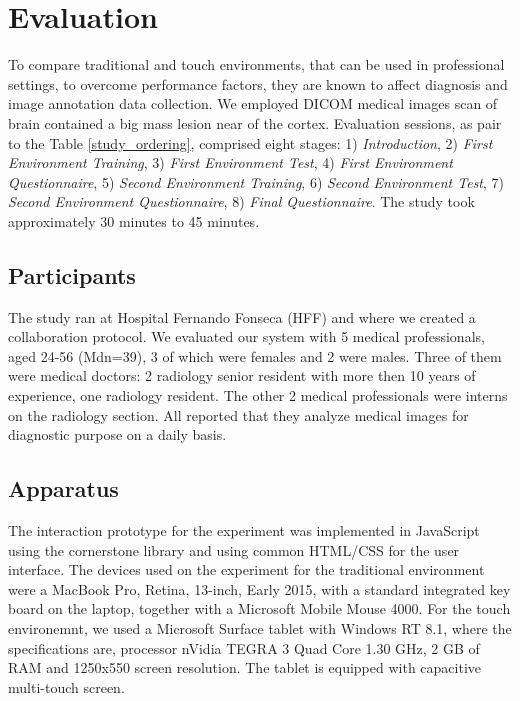 \documentclass{sigchi}
\begin{document}
\section{Evaluation}

To compare traditional and touch environments, that can be used in professional settings, to overcome performance factors, they are known to affect diagnosis and image annotation data collection. We employed DICOM \cite{mildenberger2002introduction} medical images scan of brain contained a big mass lesion near of the cortex. Evaluation sessions, as pair to the Table \ref{study_ordering}, comprised eight stages: 1) \textit{Introduction}, 2) \textit{First Environment Training}, 3) \textit{First Environment Test}, 4) \textit{First Environment Questionnaire}, 5) \textit{Second Environment Training}, 6) \textit{Second Environment Test}, 7) \textit{Second Environment Questionnaire}, 8) \textit{Final Questionnaire}. The study took approximately 30 minutes to 45 minutes.

\subsection{Participants}

The study ran at Hospital Fernando Fonseca (HFF) and where we created a collaboration protocol. We evaluated our system with 5 medical professionals, aged 24-56 (Mdn=39), 3 of which were females and 2 were males. Three of them were medical doctors: 2 radiology senior resident with more then 10 years of experience, one radiology resident. The other 2 medical professionals were interns on the radiology section. All reported that they analyze medical images for diagnostic purpose on a daily basis.

\subsection{Apparatus}

The interaction prototype for the experiment was implemented in JavaScript using the cornerstone \cite{cornerstone} library and using common HTML/CSS for the user interface. The devices used on the experiment for the traditional environment were a MacBook Pro, Retina, 13-inch, Early 2015, with a standard integrated key board on the laptop, together with a Microsoft Mobile Mouse 4000. For the touch environemnt, we used a Microsoft Surface tablet with Windows RT 8.1, where the specifications are, processor nVidia TEGRA 3 Quad Core 1.30 GHz, 2 GB of RAM and 1250x550 screen resolution. The tablet is equipped with capacitive multi-touch screen.
\end{document}
